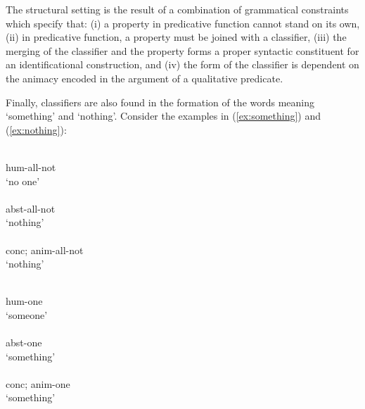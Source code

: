 \begin{exe}
\begin{exe}
\begin{exe}
{\begin{exe}
\begin{exe}
\begin{exe}
\begin{exe}
\begin{exe}
\begin{exe}
\begin{exe}
\begin{xlist}
\begin{exe}
\begin{exe}
\begin{exe}
\begin{exe}
\begin{exe}
\begin{exe}
\begin{exe}
\begin{exe}
\begin{exe}
\begin{exe}
\begin{exe}
\begin{exe}
\begin{exe}
The structural setting  is the result of a combination of grammatical
constraints which specify that: (i) a property in predicative function cannot
stand on its own, (ii) in predicative function,  a property must be joined with
a classifier, (iii) the merging of the classifier and the property forms a
proper syntactic constituent for an identificational construction, and (iv) the
form of the classifier is dependent on the animacy encoded in the argument of a
qualitative predicate. 

Finally,  classifiers are also found in the formation of the words
meaning  `something' and `nothing'. Consider the examples in 
(\ref{ex:something}) and (\ref{ex:nothing}):


\begin{multicols}{2}
\ea


\ea\label{ex:somethingH}
\\
 {\sc hum}-all-not\\
\glt `no one'\\
\ex\label{ex:somethingC}
\\
 {\sc abst}-all-not\\
\glt `nothing'\\
\ex\label{ex:somethingA}
\\
 {\sc  conc; anim}-all-not\\
\glt `nothing'\\

\z
\z

% 
\ea
 

\ea\label{ex:somethingH}
\\
 {\sc hum}-one\\
\glt `someone'\\
\ex\label{ex:somethingC}
\\
 {\sc abst}-one\\
\glt `something'\\
\ex\label{ex:somethingA}
\\
 {\sc conc; anim}-one\\
\glt `something'\\

\z
\z

\end{multicols}


\end{exe}
\end{exe}
\end{exe}
\end{exe}
\end{exe}
\end{exe}
\end{exe}
\end{exe}
\end{exe}
\end{exe}
\end{exe}
\end{exe}
\end{exe}
\end{xlist}
\end{exe}
\end{exe}
\end{exe}
\end{exe}
\end{exe}
\end{exe}
\end{exe}}
\end{exe}
\end{exe}
\end{exe}
